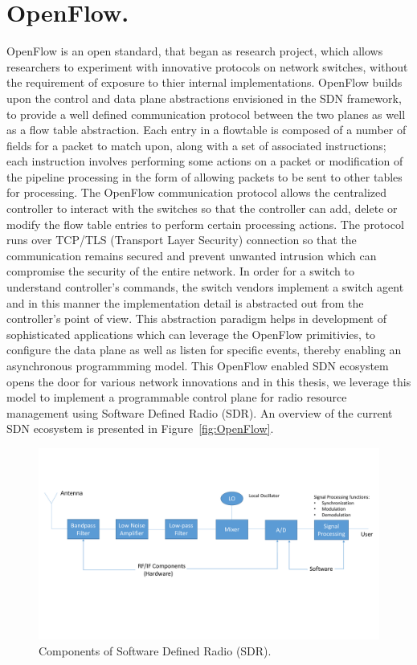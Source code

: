 \section{OpenFlow.}
OpenFlow is an open standard, that began as research project, which allows researchers to experiment with innovative protocols on network switches, without the requirement of exposure to thier internal implementations. OpenFlow\cite{openflow} builds upon the control and data plane abstractions envisioned in the SDN framework, to provide a well defined communication protocol between the two planes as well as a flow table abstraction. Each entry in a flowtable is composed of a number of fields for a packet to match upon, along with a set of associated instructions; each instruction involves performing some actions on a packet or modification of the pipeline processing in the form of allowing packets to be sent to other tables for processing. The OpenFlow communication protocol allows the centralized controller to interact with the switches so that the controller can add, delete or modify the flow table entries to perform certain processing actions. The protocol runs over TCP/TLS (Transport Layer Security) connection so that the communication remains secured and prevent unwanted intrusion which can compromise the security of the entire network. In order for a switch to understand controller's commands, the switch vendors implement a switch agent and in this manner the implementation detail is abstracted out from the controller's point of view. This abstraction paradigm helps in development of sophisticated applications which can leverage the OpenFlow primitivies, to configure the data plane as well as listen for specific events, thereby enabling an asynchronous programmming model. This OpenFlow enabled SDN ecosystem opens the door for various network innovations and in this thesis, we leverage this model to implement a programmable control plane for radio resource management using Software Defined Radio (SDR). An overview of the current SDN ecosystem is presented in Figure~\ref{fig:OpenFlow}.     


\begin{figure}[t]
  \centering
  \includegraphics[width=1\textwidth]{figures/SDR.pdf}
  \caption{Components of Software Defined Radio (SDR).}
  \label{fig:SDR}
\end{figure}
